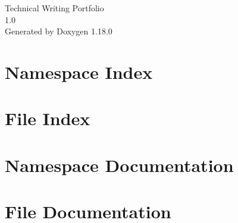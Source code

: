 \documentclass[twoside]{book}
\newcommand{\+}{\discretionary{\mbox{\scriptsize$\hookleftarrow$}}{}{}}
\newcommand{\clearemptydoublepage}{%
    \newpage{\pagestyle{empty}\cleardoublepage}%
  }
\begin{document}
  \raggedbottom
    \hypersetup{pageanchor=false,
                bookmarksnumbered=true,
                pdfencoding=unicode
               }
  \begin{titlepage}
  \vspace*{7cm}
  \begin{center}%
  {\Large Technical Writing Portfolio}\\
  [1ex]\large 1.\+0 \\
  \vspace*{1cm}
  {\large Generated by Doxygen 1.18.0}\\
  \end{center}
  \end{titlepage}
  \clearemptydoublepage
  \tableofcontents
  \clearemptydoublepage
  \hypersetup{pageanchor=true}
\chapter{Namespace Index}

\chapter{File Index}

\chapter{Namespace Documentation}

\chapter{File Documentation}


  \backmatter
  \newpage
  \clearemptydoublepage
  \printindex
\end{document}
